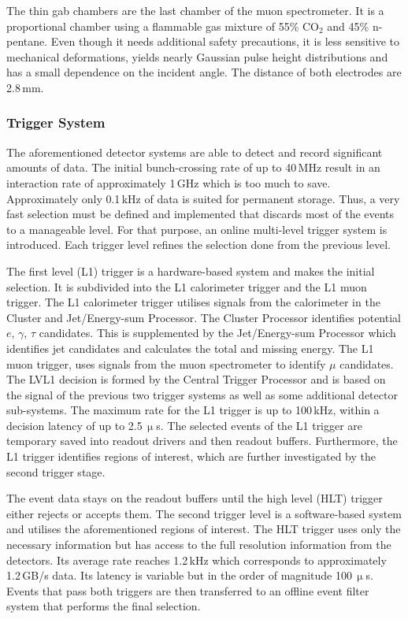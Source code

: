 \documentclass[bachelor,ngerman,english]{GAUBM}
\begin{document}
The thin gab chambers \cite{atlas:tech_design_report_01,atlas:muon_chamber} are the last chamber of the muon spectrometer. It is a proportional chamber using a flammable gas mixture of 55\% CO$_2$ and 45\% n-pentane. Even though it needs additional safety precautions, it is less sensitive to mechanical deformations, yields nearly Gaussian pulse height distributions and has a small dependence on the incident angle. The distance of both electrodes are 2.8\,mm.

\subsubsection*{Trigger System}
The aforementioned detector systems are able to detect and record significant amounts of data. The initial bunch-crossing rate of up to 40\,MHz result in an interaction rate of approximately 1\,GHz \cite{atlas:tech_design_report_01} which is too much to save. Approximately only 0.1\,kHz of data is suited for permanent storage. Thus, a very fast selection must be defined and implemented that discards most of the events to a manageable level. For that purpose, an online multi-level trigger system is introduced. Each trigger level refines the selection done from the previous level.

The first level (L1) trigger \cite{atlas:tech_design_report_01,atlas:trigger_run2} is a hardware-based system and makes the initial selection. It is subdivided into the L1 calorimeter trigger and the L1 muon trigger. The L1 calorimeter trigger utilises signals from the calorimeter in the Cluster and Jet/Energy-sum Processor. The Cluster Processor identifies potential $e$, $\gamma$, $\tau$ candidates. This is supplemented by the Jet/Energy-sum Processor which identifies jet candidates and calculates the total and missing energy. The L1 muon trigger, uses signals from the muon spectrometer to identify $\mu$ candidates. The LVL1 decision is formed by the Central Trigger Processor and is based on the signal of the previous two trigger systems as well as some additional detector sub-systems. The maximum rate for the L1 trigger is up to 100\,kHz, within a decision latency of up to 2.5\,$\upmu$s. The selected events of the L1 trigger are temporary saved into readout drivers and then readout buffers. Furthermore, the L1 trigger identifies regions of interest, which are further investigated by the second trigger stage.

The event data stays on the readout buffers until the high level (HLT) trigger \cite{atlas:tech_design_report_01,atlas:trigger_run2} either rejects or accepts them. The second trigger level is a software-based system and utilises the aforementioned regions of interest. The HLT trigger uses only the necessary information but has access to the full resolution information from the detectors. Its average rate reaches 1.2\,kHz which corresponds to approximately 1.2\,GB/s data. Its latency is variable but in the order of magnitude 100\,$\upmu$s. Events that pass both triggers are then transferred to an offline event filter system that performs the final selection.
\end{document}
